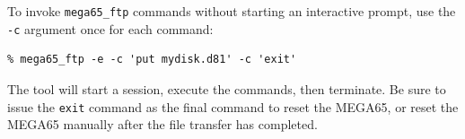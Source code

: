 To invoke {\tt mega65\_ftp} commands without starting an interactive prompt, use the {\tt -c} argument once for each command:

\begin{verbatim}
% mega65_ftp -e -c 'put mydisk.d81' -c 'exit'
\end{verbatim}

The tool will start a session, execute the commands, then terminate. Be sure to issue the {\tt exit} command as the final command to reset the MEGA65, or reset the MEGA65 manually after the file transfer has completed.